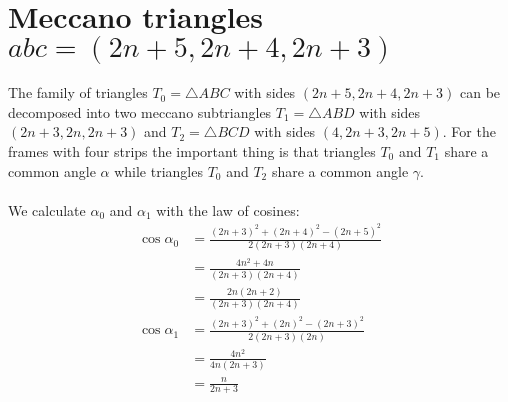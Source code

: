 \documentclass[11pt]{article}
\begin{document}
\section{Meccano triangles $abc=(2n+5,2n+4,2n+3)$}

The family of triangles $T_0=\triangle{ABC}$ with sides $(2n+5,2n+4,2n+3)$ can be decomposed into two meccano subtriangles $T_1 = \triangle{ABD}$ with sides $(2n+3,2n,2n+3)$ and $T_2=\triangle{BCD}$ with sides $(4,2n+3,2n+5)$. For the frames with four strips the important thing is that triangles $T_0$ and $T_1$ share a common angle $\alpha$ while triangles $T_0$ and $T_2$ share a common angle $\gamma$.
\\\\
We calculate $\alpha_0$ and $\alpha_1$ with the law of cosines:
\begin{align}
\cos\alpha_0 &= \frac{(2n+3)^2 + (2n+4)^2 - (2n+5)^2}{2(2n+3)(2n+4)}\nonumber\\
 &= \frac{4n^2+4n}{(2n+3)(2n+4)}\nonumber\\
 &= \frac{2n(2n+2)}{(2n+3)(2n+4)}\\
\cos\alpha_1 &= \frac{(2n+3)^2 + (2n)^2 - (2n+3)^2}{2(2n+3)(2n)}\nonumber\\
 &= \frac{4n^2}{4n(2n+3)}\nonumber\\
 &= \frac{n}{2n+3}
\end{align}

%
\end{document}

